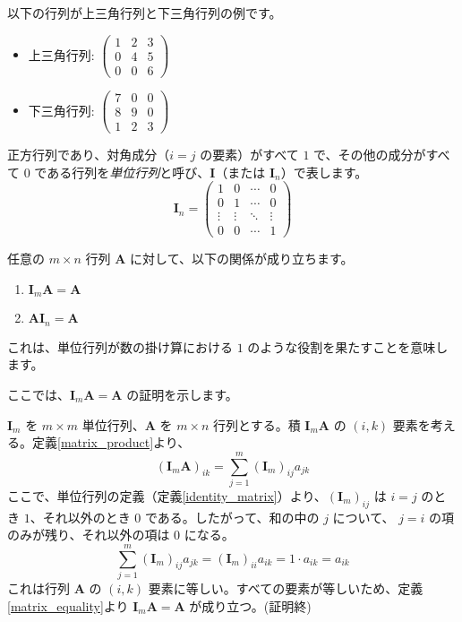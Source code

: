 \begin{ex}
以下の行列が上三角行列と下三角行列の例です。
\begin{itemize}
\item 上三角行列: $\begin{pmatrix} 1 & 2 & 3 \\ 0 & 4 & 5 \\ 0 & 0 & 6 \end{pmatrix}$
\item 下三角行列: $\begin{pmatrix} 7 & 0 & 0 \\ 8 & 9 & 0 \\ 1 & 2 & 3 \end{pmatrix}$
\end{itemize}
\end{ex}

\begin{dfn}[単位行列] \label{identity_matrix}
正方行列であり、対角成分（$i=j$ の要素）がすべて $1$ で、その他の成分がすべて $0$ である行列を\emph{単位行列}と呼び、$\bm{I}$（または $\bm{I}_n$）で表します。
\[\bm{I}_n = \begin{pmatrix}
1 & 0 & \cdots & 0 \\
0 & 1 & \cdots & 0 \\
\vdots & \vdots & \ddots & \vdots \\
0 & 0 & \cdots & 1
\end{pmatrix}\]
\end{dfn}

\begin{thm}[単位行列の性質] \label{identity_matrix_property}
任意の $m \times n$ 行列 $\bm{A}$ に対して、以下の関係が成り立ちます。
\begin{enumerate}
\item $\bm{I}_m \bm{A} = \bm{A}$
\item $\bm{A} \bm{I}_n = \bm{A}$
\end{enumerate}
これは、単位行列が数の掛け算における $1$ のような役割を果たすことを意味します。
\begin{proof*}
ここでは、$\bm{I}_m \bm{A} = \bm{A}$ の証明を示します。\par
$\bm{I}_m$ を $m \times m$ 単位行列、$\bm{A}$ を $m \times n$ 行列とする。積 $\bm{I}_m \bm{A}$ の $(i,k)$ 要素を考える。定義\ref{matrix_product}より、
\[(\bm{I}_m \bm{A})_{ik} = \sum_{j=1}^{m} (\bm{I}_m)_{ij} a_{jk}\]
ここで、単位行列の定義（定義\ref{identity_matrix}）より、$ (\bm{I}_m)_{ij} $ は $i=j$ のとき $1$、それ以外のとき $0$ である。したがって、和の中の $j$ について、 $j=i$ の項のみが残り、それ以外の項は $0$ になる。
\[\sum_{j=1}^{m} (\bm{I}_m)_{ij} a_{jk} = (\bm{I}_m)_{ii} a_{ik} = 1 \cdot a_{ik} = a_{ik}\]
これは行列 $\bm{A}$ の $(i,k)$ 要素に等しい。すべての要素が等しいため、定義\ref{matrix_equality}より $\bm{I}_m \bm{A} = \bm{A}$ が成り立つ。(証明終)
\end{proof*}
\end{thm}

